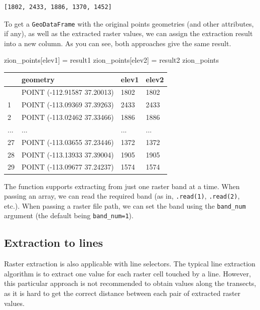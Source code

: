 \documentclass[
  letterpaper,
]{krantz}
\newenvironment{Shaded}{\begin{snugshade}}{\end{snugshade}}
\newcommand{\NormalTok}[1]{\textcolor[rgb]{0.00,0.23,0.31}{#1}}
\newcommand{\OperatorTok}[1]{\textcolor[rgb]{0.37,0.37,0.37}{#1}}
\newcommand{\StringTok}[1]{\textcolor[rgb]{0.13,0.47,0.30}{#1}}
\begin{document}
\begin{verbatim}
[1802, 2433, 1886, 1370, 1452]
\end{verbatim}

To get a \texttt{GeoDataFrame} with the original points geometries (and
other attributes, if any), as well as the extracted raster values, we
can assign the extraction result into a new column. As you can see, both
approaches give the same result.

\begin{Shaded}
\begin{Highlighting}[]
\NormalTok{zion\_points[}\StringTok{\textquotesingle{}elev1\textquotesingle{}}\NormalTok{] }\OperatorTok{=}\NormalTok{ result1}
\NormalTok{zion\_points[}\StringTok{\textquotesingle{}elev2\textquotesingle{}}\NormalTok{] }\OperatorTok{=}\NormalTok{ result2}
\NormalTok{zion\_points}
\end{Highlighting}
\end{Shaded}

\begin{longtable}[]{@{}llll@{}}
\toprule\noalign{}
& geometry & elev1 & elev2 \\
\midrule\noalign{}
\endhead
\bottomrule\noalign{}
\endlastfoot
0 & POINT (-112.91587 37.20013) & 1802 & 1802 \\
1 & POINT (-113.09369 37.39263) & 2433 & 2433 \\
2 & POINT (-113.02462 37.33466) & 1886 & 1886 \\
... & ... & ... & ... \\
27 & POINT (-113.03655 37.23446) & 1372 & 1372 \\
28 & POINT (-113.13933 37.39004) & 1905 & 1905 \\
29 & POINT (-113.09677 37.24237) & 1574 & 1574 \\
\end{longtable}

The function supports extracting from just one raster band at a time.
When passing an array, we can read the required band (as in,
\texttt{.read(1)}, \texttt{.read(2)}, etc.). When passing a raster file
path, we can set the band using the \texttt{band\_num} argument (the
default being \texttt{band\_num=1}).

\subsection{Extraction to lines}\label{sec-extraction-to-lines}

Raster extraction is also applicable with line selectors. The typical
line extraction algorithm is to extract one value for each raster cell
touched by a line. However, this particular approach is not recommended
to obtain values along the transects, as it is hard to get the correct
distance between each pair of extracted raster values.
\end{document}
